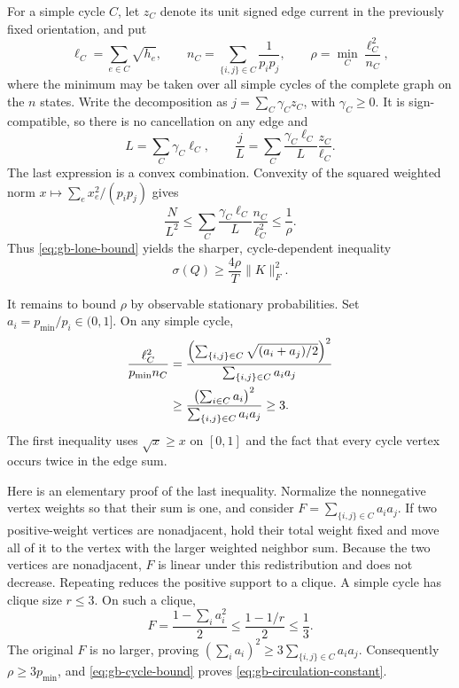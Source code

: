 For a simple cycle $C$, let $z_C$ denote its unit signed edge current
in the previously fixed orientation, and put
\[
 \ell_C=\sum_{e\in C}\sqrt{h_e},\qquad
 n_C=\sum_{\{i,j\}\in C}\frac1{p_ip_j},\qquad
 \rho=\min_C\frac{\ell_C^2}{n_C},
\]
where the minimum may be taken over all simple cycles of the complete
graph on the $n$ states. Write the decomposition as
$j=\sum_C\gamma_Cz_C$, with $\gamma_C\geq0$. It is sign-compatible,
so there is no cancellation on any edge and
\[
 L=\sum_C\gamma_C\ell_C,\qquad
 \frac jL=\sum_C\frac{\gamma_C\ell_C}{L}
                    \frac{z_C}{\ell_C}.
\]
The last expression is a convex combination. Convexity of the squared
weighted norm $x\mapsto\sum_e x_e^2/(p_ip_j)$ gives
\[
 \frac{N}{L^2}
 \leq\sum_C\frac{\gamma_C\ell_C}{L}\frac{n_C}{\ell_C^2}
 \leq\frac1\rho.
\]
Thus \eqref{eq:gb-lone-bound} yields the sharper, cycle-dependent
inequality
\begin{equation}
 \sigma(Q)\geq\frac{4\rho}{T}\|K\|_F^2.
 \label{eq:gb-cycle-bound}
\end{equation}

It remains to bound $\rho$ by observable stationary probabilities.
Set $a_i=p_{\min}/p_i\in(0,1]$. On any simple cycle,
\begin{align}
 \frac{\ell_C^2}{p_{\min}n_C}
 &=\frac{\left(\sum_{\{i,j\}\in C}
              \sqrt{(a_i+a_j)/2}\right)^2}
          {\sum_{\{i,j\}\in C}a_ia_j}\notag\\
 &\geq\frac{\left(\sum_{i\in C}a_i\right)^2}
              {\sum_{\{i,j\}\in C}a_ia_j}
 \geq3.
 \label{eq:gb-cycle-clique}
\end{align}
The first inequality uses $\sqrt{x}\geq x$ on $[0,1]$ and the fact
that every cycle vertex occurs twice in the edge sum.

Here is an elementary proof of the last inequality. Normalize the
nonnegative vertex weights so that their sum is one, and consider
$F=\sum_{\{i,j\}\in C}a_ia_j$. If two positive-weight vertices are
nonadjacent, hold their total weight fixed and move all of it to the
vertex with the larger weighted neighbor sum. Because the two
vertices are nonadjacent, $F$ is linear under this redistribution and
does not decrease. Repeating reduces the positive support to a
clique. A simple cycle has clique size $r\leq3$. On such a clique,
\[
 F=\frac{1-\sum_i a_i^2}{2}
 \leq\frac{1-1/r}{2}\leq\frac13.
\]
The original $F$ is no larger, proving
$(\sum_i a_i)^2\geq3\sum_{\{i,j\}\in C}a_ia_j$.
Consequently $\rho\geq3p_{\min}$, and
\eqref{eq:gb-cycle-bound} proves
\eqref{eq:gb-circulation-constant}.

